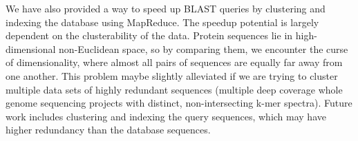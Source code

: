 We have also provided a way to speed up BLAST queries by clustering and indexing the database using MapReduce.
The speedup potential is largely dependent on the clusterability of the data.
Protein sequences lie in high-dimensional non-Euclidean space, so by comparing them, we encounter the curse of dimensionality, where almost all pairs of sequences are equally far away from one another.
This problem maybe slightly alleviated if we are trying to cluster multiple data sets of highly redundant sequences (multiple deep coverage whole genome sequencing projects with distinct, non-intersecting k-mer spectra).
Future work includes clustering and indexing the query sequences, which may have higher redundancy than the database sequences.



